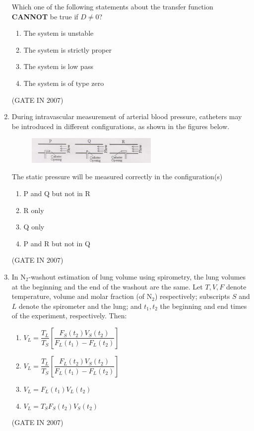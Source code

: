 \documentclass[journal]{IEEEtran}
\begin{document}
\begin{enumerate}
Which one of the following statements about the transfer function \textbf{CANNOT} be true if $D \neq 0$?
\begin{multicols}{2}
\begin{enumerate}
\item The system is unstable  
\item The system is strictly proper  
\item The system is low pass  
\item The system is of type zero  
\end{enumerate}
\end{multicols}
\hfill(GATE IN 2007)

\item During intravascular measurement of arterial blood pressure, catheters may be introduced in different configurations, as shown in the figures below.  
\begin{figure}[H]
    \centering
      \includegraphics[width=0.6\textwidth]{12.jpg} 
      \caption{}
    \label{fig:fig12} 
\end{figure}
The static pressure will be measured correctly in the configuration(s)
\begin{multicols}{2}
\begin{enumerate}
\item P and Q but not in R  
\item R only  
\item Q only  
\item P and R but not in Q  
\end{enumerate}
\end{multicols}
\hfill(GATE IN 2007)
\item In $ \text{N}_2 $-washout estimation of lung volume using spirometry, the lung volumes at the beginning and the end of the washout are the same. Let $ T, V, F $ denote temperature, volume and molar fraction (of $ \text{N}_2 $) respectively; subscripts $ S $ and $ L $ denote the spirometer and the lung; and $ t_1, t_2 $ the beginning and end times of the experiment, respectively. Then:
\begin{multicols}{2}
\begin{enumerate}
\item $ V_L = \dfrac{T_L}{T_S} \left[ \dfrac{F_S(t_2)V_S(t_2)}{F_L(t_1) - F_L(t_2)} \right] $
\item $ V_L = \dfrac{T_L}{T_S} \left[ \dfrac{F_L(t_2)V_S(t_2)}{F_L(t_1) - F_L(t_2)} \right] $
\item $ V_L = F_L(t_1)V_L(t_2) $
\item $ V_L = T_S F_S(t_2)V_S(t_2) $
\end{enumerate}
\end{multicols}
\hfill(GATE IN 2007)


\end{enumerate}
\end{document}
